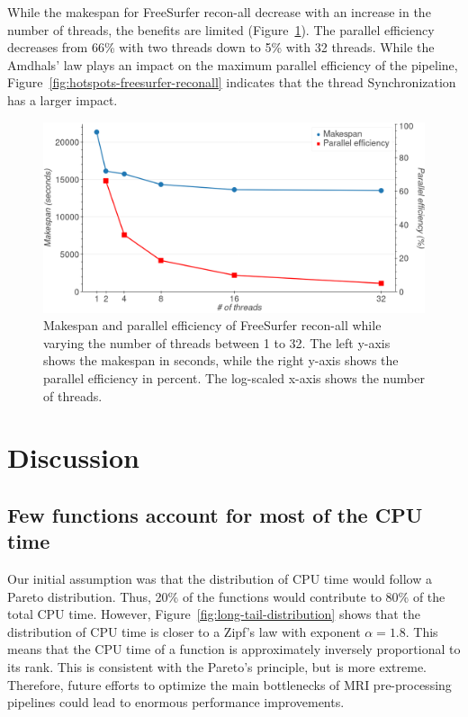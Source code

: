 \documentclass[conference]{IEEEtran}
\begin{document}
While the makespan for FreeSurfer recon-all decrease with an increase in the number of threads, the benefits are limited (Figure~\ref{fig:freesurfer-threading}). The parallel efficiency decreases from 66\% with two threads down to 5\% with 32 threads. While the Amdhals' law plays an impact on the maximum parallel efficiency of the pipeline, Figure~\ref{fig:hotspots-freesurfer-reconall} indicates that the thread Synchronization has a larger impact.
					
\begin{figure}
	\includegraphics[width=\linewidth]{figures/makespan-freesurfer.png}
	\caption{Makespan and parallel efficiency of FreeSurfer recon-all while varying the number of threads between 1 to 32. The left y-axis shows the makespan in seconds, while the right y-axis shows the parallel efficiency in percent. The log-scaled x-axis shows the number of threads.}
	\label{fig:freesurfer-threading}
\end{figure}
								
\section{Discussion}
\subsection{Few functions account for most of the CPU time}
Our initial assumption was that the distribution of CPU time would follow a Pareto distribution. Thus, 20\% of the functions would contribute to 80\% of the total CPU time. However, Figure~\ref{fig:long-tail-distribution} shows that the distribution of CPU time is closer to a Zipf's law with exponent $\alpha=1.8$. This means that the CPU time of a function is approximately inversely proportional to its rank. This is consistent with the Pareto's principle, but is more extreme. Therefore, future efforts to optimize the main bottlenecks of MRI pre-processing pipelines could lead to enormous performance improvements.
			
\end{document}
